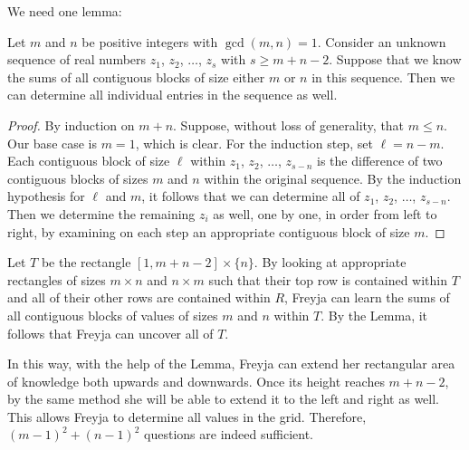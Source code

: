 \documentclass[11pt]{scrartcl}
\begin{document}
We need one lemma:
\begin{lemma*}
  Let $m$ and $n$ be positive integers with $\gcd(m, n) = 1$.
  Consider an unknown sequence of real numbers $z_1$, $z_2$, $\dots$, $z_s$
  with $s \ge m + n - 2$. Suppose that we know the sums of all contiguous blocks
  of size either $m$ or $n$ in this sequence. Then we can determine all
  individual entries in the sequence as well.
\end{lemma*}

\begin{proof}
  By induction on $m + n$. Suppose, without loss of generality, that $m \le n$.
  Our base case is $m = 1$, which is clear. For the induction step, set $\ell =
  n - m$. Each contiguous block of size $\ell$ within $z_1$, $z_2$, $\dots$,
  $z_{s - n}$ is the difference of two contiguous blocks of sizes $m$ and $n$
  within the original sequence. By the induction hypothesis for $\ell$ and $m$,
  it follows that we can determine all of $z_1$, $z_2$, $\dots$, $z_{s - n}$.
  Then we determine the remaining $z_i$ as well, one by one, in order from left
  to right, by examining on each step an appropriate contiguous block of size $m$.
\end{proof}

Let $T$ be the rectangle $[1, m + n - 2] \times \{n\}$. By looking at
appropriate rectangles of sizes $m \times n$ and $n \times m$ such that
their top row is contained within $T$ and all of their other rows are
contained within $R$, Freyja can learn the sums of all contiguous blocks of
values of sizes $m$ and $n$ within $T$. By the Lemma, it follows that Freyja
can uncover all of $T$.

In this way, with the help of the Lemma, Freyja can extend her rectangular area
of knowledge both upwards and downwards. Once its height reaches $m + n -
2$, by the same method she will be able to extend it to the left and right as
well. This allows Freyja to determine all values in the grid. Therefore, $(m -
1)^2 + (n - 1)^2$ questions are indeed sufficient.
\end{document}
